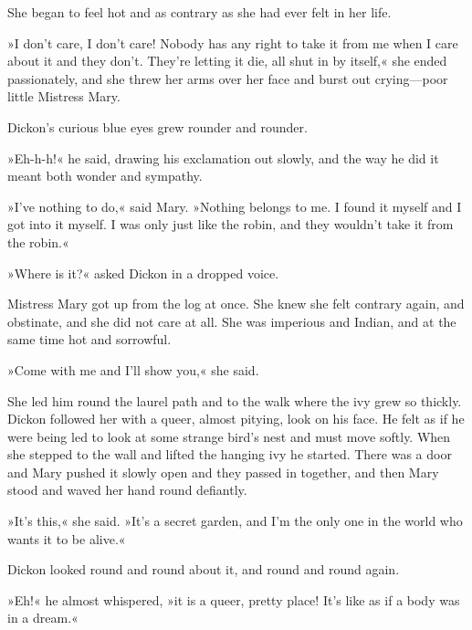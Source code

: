 She began to feel hot and as contrary as she had ever felt in her life.

»I don't care, I don't care! Nobody has any right to take it from me when I care about it and they don't. They're letting it die, all shut in by itself,« she ended passionately, and she threw her arms over her face and burst out crying—poor little Mistress Mary.

Dickon's curious blue eyes grew rounder and rounder.

»Eh-h-h!« he said, drawing his exclamation out slowly, and the way he did it meant both wonder and sympathy.

»I've nothing to do,« said Mary. »Nothing belongs to me. I found it myself and I got into it myself. I was only just like the robin, and they wouldn't take it from the robin.«

»Where is it?« asked Dickon in a dropped voice.

Mistress Mary got up from the log at once. She knew she felt contrary again, and obstinate, and she did not care at all. She was imperious and Indian, and at the same time hot and sorrowful.

»Come with me and I'll show you,« she said.

She led him round the laurel path and to the walk where the ivy grew so thickly. Dickon followed her with a queer, almost pitying, look on his face. He felt as if he were being led to look at some strange bird's nest and must move softly. When she stepped to the wall and lifted the hanging ivy he started. There was a door and Mary pushed it slowly open and they passed in together, and then Mary stood and waved her hand round defiantly.

»It's this,« she said. »It's a secret garden, and I'm the only one in the world who wants it to be alive.«

Dickon looked round and round about it, and round and round again.

»Eh!« he almost whispered, »it is a queer, pretty place! It's like as if a body was in a dream.«